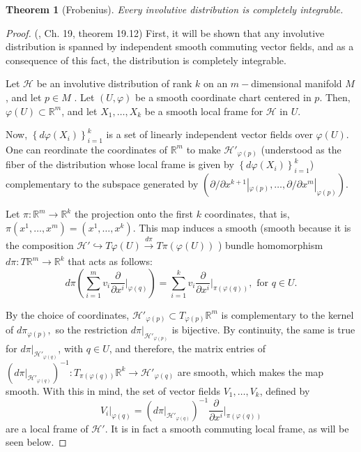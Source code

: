\documentclass[12pt, letterpaper, reqno]{amsart}
\theoremstyle{definition}
\theoremstyle{plain}
\newtheorem{thm}{Theorem}
\theoremstyle{remark}
\begin{document}
\begin{thm}[Frobenius]
	Every involutive distribution is completely integrable.	
\end{thm}

\begin{proof}
	(\cite{lee2003introduction}, Ch. 19, theorem 19.12) First, it will be shown that any involutive distribution is spanned by independent smooth commuting vector fields, and as a consequence of this fact, the distribution is completely integrable.

	Let $ \mathcal{H} $ be an involutive distribution of rank $ k $ on an $ m- $dimensional manifold $ M $, and let $ p\in M $ . Let $ (U,\varphi) $ be a smooth coordinate chart centered in $ p. $ Then, $ \varphi(U)\subset \mathbb{R}^m $, and let $ X_1,\dots,X_k $ be a smooth local frame for $ \mathcal{H} $ in $ U. $

	Now, $ \left\{ d\varphi \left( X_i \right) \right\}_{i=1}^k $ is a set of linearly independent vector fields over $ \varphi(U). $ One can reordinate the coordinates of $ \mathbb{R}^m $ to make $ \mathcal{H}'_{\varphi(p)} $ (understood as the fiber of the distribution whose local frame is given by $ \left\{ d\varphi \left( X_i \right) \right\}_{i=1}^k $) complementary to the subspace generated by $ \left( \partial/\partial x^{k+1}|_{\varphi(p)},\dots,\partial/\partial x^{m}|_{\varphi(p)} \right). $   

	Let $ \pi: \mathbb{R}^m \rightarrow  \mathbb{R}^k$ the projection onto the first $ k $ coordinates, that is, $ \pi(x^1,\dots,x^m)=(x^1,\dots,x^k). $ This map induces a smooth (smooth because it is the composition $\mathcal{H}' \hookrightarrow T\varphi(U) \xrightarrow[]{d\pi} T\pi(\varphi(U))$ )  bundle homomorphism $ d\pi: T \mathbb{R}^m \rightarrow \mathbb{R}^k	 $ that acts as follows:
	$$ d\pi \left( \sum_{i=1}^m v_i \frac{\partial}{\partial x^i} \Big|_{\varphi(q)}   \right) = \sum_{i=1}^k v_i \frac{\partial}{\partial x^i} \Big|_{\pi(\varphi(q))}, \text{ for }q\in U.$$ 

	By the choice of coordinates, $ \mathcal{H}'_{\varphi(p)}\subset T_{\varphi(p)} \mathbb{R}^m $ is complementary to the kernel of $ d\pi_{\varphi(p)}, $ so the restriction $ d\pi|_{\mathcal{H}'_{\varphi(p)}} $ is bijective. By continuity, the same is true for $ d\pi|_{\mathcal{H}'_{\varphi(q)}} $, with $ q\in U $, and therefore, the matrix entries of $ \left(d\pi|_{\mathcal{H}'_{\varphi(q)}} \right)^{-1}: T_{\pi(\varphi(q))} \mathbb{R}^k \rightarrow \mathcal{H}'_{\varphi(q)}$ are smooth, which makes the map smooth. With this in mind, the set of vector fields $ V_1,\dots,V_k $, defined by
	$$ V_i|_{\varphi(q)}= \left(  d\pi|_{\mathcal{H}'_{\varphi(q)}}  \right)^{-1} \frac{\partial}{\partial x^i} \Big|_{\pi(\varphi(q))} $$ 
	are a local frame of $ \mathcal{H'}. $ It is in fact a smooth commuting local frame, as will be seen below. 


\end{proof}
\end{document}
